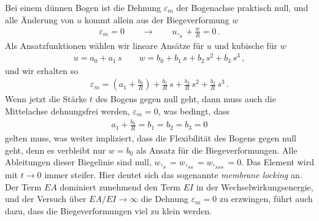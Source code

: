Bei einem d\"{u}nnen Bogen ist die Dehnung $\varepsilon_m$ der Bogenachse praktisch null,
und alle \"{A}nderung von $u$ kommt allein aus der Biegeverformung $w$
\begin{align}
\varepsilon_m = 0 \qquad \rightarrow \qquad u,_s + \frac{w}{R} = 0\,.
\end{align}
Als Ansatzfunktionen w\"{a}hlen wir lineare Ans\"{a}tze f\"{u}r $u$ und kubische f\"{u}r $w$
\begin{align}
u = a_0 + a_1\,s \qquad w = b_0 + b_1\,s + b_2\,s^2 + b_3\,s^3\,,
\end{align}
und wir erhalten so
\begin{align}
\varepsilon_m = (a_1 + \frac{b_0}{R}) + \frac{b_1}{R} \,s + \frac{b_2}{R}\,s^2 +
\frac{b_3}{R}\,s^3\,.
\end{align}
Wenn jetzt die St\"{a}rke $t$ des Bogens gegen null geht, dann muss auch die Mittelachse
dehnungsfrei werden, $\varepsilon_m = 0$, was bedingt, dass
\begin{align}
a_1 + \frac{b_0}{R} = b_1 = b_2 = b_3 = 0
\end{align}
gelten muss, was weiter impliziert, dass die Flexibilit\"{a}t des Bogens gegen null geht, denn es verbleibt nur $w = b_0$ als Ansatz f\"{u}r die Biegeverformungen. Alle Ableitungen dieser Biegelinie sind null, $w,_s = w,_{ss} = w,_{sss} = 0$. Das Element wird mit $t \to 0$ immer steifer. Hier deutet sich das sogenannte {\em membrane locking\/} an. Der Term $EA$ dominiert zunehmend den Term $EI$ in der Wechselwirkungsenergie, und der Versuch \"{u}ber $EA/EI \to \infty$ die Dehnung $\varepsilon_m = 0$ zu erzwingen, f\"{u}hrt auch dazu, dass die Biegeverformungen viel zu klein werden.

